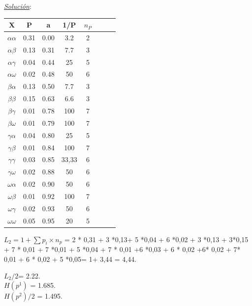 \documentclass{beamer}
\theoremstyle{plain}
\theoremstyle{example}
\theoremstyle{example}
\begin{document}
\begin{frame}  \tiny
\textit{\underline{Solución}}:\\ 
\begin{center}
 \begin{tabular}{ c c c c c c c c}
        		 X             & P      &   a    & 1/P & $n_P$ \\\hline\hline
   $\alpha\alpha$    & 0.31 & 0.00 & 3.2   & 2       \\\hline
   $\alpha\beta$      & 0.13 & 0.31 & 7.7   & 3		 \\\hline
   $\alpha\gamma$ & 0.04 & 0.44 & 25    & 5		 \\\hline
   $\alpha\omega$  & 0.02 & 0.48 & 50    & 6      \\\hline
  
   $\beta\alpha$      & 0.13 & 0.50 & 7.7    & 3      \\\hline
   $\beta\beta$        & 0.15 & 0.63 &  6.6   &   3    \\\hline
   $\beta\gamma$   & 0.01 & 0.78  &  100   &   7    \\\hline
   $\beta\omega$    & 0.01 & 0.79 &   100  &    7   \\\hline
   
   $\gamma\alpha$    & 0.04 & 0.80 &  25   &    5   \\\hline
   $\gamma\beta$      & 0.01 & 0.84 &  100  &   7    \\\hline
   $\gamma\gamma$ &  0.03&  0.85&   33,33  & 6      \\\hline
   $\gamma\omega$  &  0.02& 0.88 &    50 &   6    \\\hline

   $\omega\alpha$      & 0.02 & 0.90&   50 &     6  \\\hline
   $\omega\beta$        & 0.01& 0.92 & 100  &    7   \\\hline
   $\omega\gamma$   & 0.02& 0.93 &    50 &    6   \\\hline
   $\omega\omega$    & 0.05& 0.95 &    20 &     5  \\\hline
 \end{tabular}
\end{center}

\footnotesize
$L_2 = 1 + \sum p_i \times n_p $ = 2 * 0,31 + 3 *0,13+ 5 *0,04 + 6 *0,02 + 3 *0,13 + 3*0,15 + 7 * 0,01 + 7 *0,01 + 5 *0,04 + 7 * 0,01 +6 *0,03 + 6 * 0,02 +6* 0,02 + 7* 0,01 + 6 * 0,02 + 5 *0,05= 1+ 3,44 = 4,44.\\

\vspace{0.5cm}

$L_2/2$= 2.22. \\
$H(p^1)$ = 1.685.\\
$H(p^2)/2$ = 1.495. 

\end{frame} 
\end{document}
